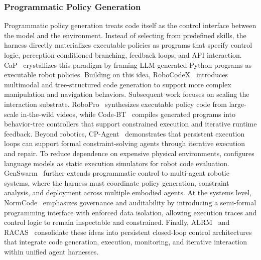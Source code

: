 \documentclass{llmxive}
\begin{document}
\subsubsection{Programmatic Policy Generation}
Programmatic policy generation treats code itself as the control
interface between the model and the environment.
Instead of selecting from predefined skills, the harness directly
materializes executable policies as programs that specify control
logic, perception-conditioned branching, feedback loops, and API
interaction.
CaP~\cite{liang2023code} crystallizes this paradigm by framing
LLM-generated Python programs as executable robot policies.
Building on this idea, RoboCodeX~\cite{mu2024robocodex}
introduces multimodal and tree-structured code generation to
support more complex manipulation and navigation behaviors.
Subsequent work focuses on scaling the interaction substrate.
RoboPro~\cite{xie2025robotic} synthesizes executable policy code
from large-scale in-the-wild videos, while
Code-BT~\cite{zhang2025codebt} compiles generated programs into
behavior-tree controllers that support constrained execution and
iterative runtime feedback.
Beyond robotics, CP-Agent~\cite{szeider2025cp} demonstrates that
persistent execution loops can support formal constraint-solving
agents through iterative execution and repair.
To reduce dependence on expensive physical environments,
\cite{wang2025llm} configures language models as static execution
simulators for robot code evaluation.
GenSwarm~\cite{ji2026genswarm} further extends programmatic
control to multi-agent robotic systems, where the harness must
coordinate policy generation, constraint analysis, and deployment
across multiple embodied agents.
At the systems level, NormCode~\cite{guan2025normcode}
emphasizes governance and auditability by introducing a
semi-formal programming interface with enforced data isolation,
allowing execution traces and control logic to remain
inspectable and constrained.
Finally, ALRM~\cite{santos2026alrm} and
RACAS~\cite{ashley2026racas} consolidate these ideas into
persistent closed-loop control architectures that integrate code
generation, execution, monitoring, and iterative interaction
within unified agent harnesses.
\end{document}
